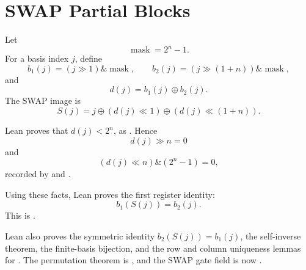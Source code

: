 \section{SWAP Partial Blocks}

Let
\[
  \operatorname{mask}=2^n-1.
\]
For a basis index \(j\), define
\[
  b_1(j)=(j\gg1)\mathbin{\&}\operatorname{mask},
  \qquad
  b_2(j)=(j\gg(1+n))\mathbin{\&}\operatorname{mask},
\]
and
\[
  d(j)=b_1(j)\oplus b_2(j).
\]
The SWAP image is
\[
  S(j)=j\oplus(d(j)\ll1)\oplus(d(j)\ll(1+n)).
\]

Lean proves that \(d(j)<2^n\), as
.  Hence
\[
  d(j)\gg n=0
\]
and
\[
  (d(j)\ll n)\mathbin{\&}(2^n-1)=0,
\]
recorded by  and
.

Using these facts, Lean proves the first register identity:
\[
  b_1(S(j))=b_2(j).
\]
This is .

Lean also proves the symmetric identity \(b_2(S(j))=b_1(j)\), the
self-inverse theorem, the finite-basis bijection, and the row and column
uniqueness lemmas for .  The permutation theorem is
, and the SWAP gate field is now
.
